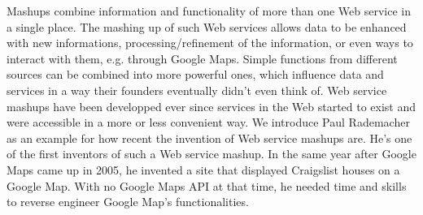 










Mashups combine information and functionality of more than one Web service in a single place.
The mashing up of such Web services allows data to be enhanced with new informations, processing/refinement of the information, or even ways to interact with them, e.g. through Google Maps.
Simple functions from different sources can be combined into more powerful ones, which influence data and services in a way their founders eventually didn't even think of.
Web service mashups have been developped ever since services in the Web started to exist and were accessible in a more or less convenient way.
We introduce Paul Rademacher as an example for how recent the invention of Web service mashups are.
He's one of the first inventors of such a Web service mashup.
In the same year after Google Maps came up in 2005, he invented a site that displayed Craigslist houses on a Google Map.
With no Google Maps API at that time, he needed time and skills to reverse engineer Google Map's functionalities.

